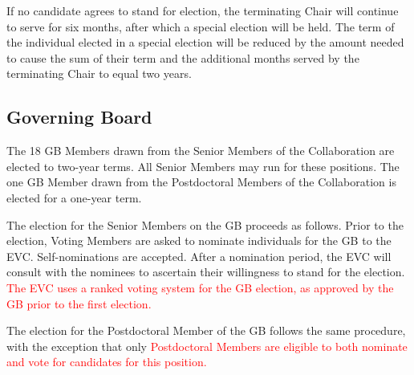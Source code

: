 \documentclass[12pt]{article}
\newcommand{\exec}{{Executive Team}}
\begin{document}
If no candidate agrees to stand for election, the terminating Chair will continue to serve for six months, after which a special election will be held. The term of the individual elected in a special election will be reduced by the amount needed to cause the sum of their term and the additional months served by the terminating Chair to equal two years.


\subsection{Governing Board}
\label{sec:gb-elections}

The 18 GB Members drawn from the Senior Members of the Collaboration are elected to two-year terms.  All Senior Members may  run for these positions. The one GB Member drawn from the Postdoctoral Members of the Collaboration is elected for a one-year term.

The election for the Senior Members on the GB proceeds as follows. 
Prior to the election, Voting Members are asked to nominate individuals for the GB to the EVC.   Self-nominations are accepted. After a nomination period, the EVC will consult with the nominees to ascertain their willingness to stand for the election.
\textcolor{red}{The EVC uses a ranked voting system for the GB election, as approved by the GB prior to the first election. }



The election for the Postdoctoral Member of the GB follows the same procedure, with the exception that only \textcolor{red}{Postdoctoral Members are eligible to both nominate and vote for candidates for this position.} 
\end{document}
